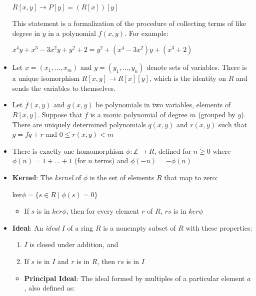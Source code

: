 \documentclass[12pt]{article}
\begin{document}
\begin{itemize}
  \begin{center}
    $R[x,y] \to P[y] = (R[x])[y]$
  \end{center}
  This statement is a formalization of the procedure of collecting terms of like degree in $y$ in a polynomial $f(x,y)$. For example:
  \begin{center}
    $x^4y + x^3 - 3x^2y + y^2 + 2 = y^2 + (x^4 - 3x^2)y + (x^3 + 2)$
  \end{center}
  \item Let $x = (x_1, ..., x_m)$ and $y = (y_1, ..., y_n)$ denote sets of variables. There is a unique isomorphism $R[x,y] \to R[x][y]$, which is the identity on $R$ and sends the variables to themselves.
  \item Let $f(x,y)$ and $g(x,y)$ be polynomials in two variables, elements of $R[x,y]$. Suppose that $f$ is a monic polynomial of degree $m$ (grouped by $y$). There are uniquely determined polynomials $q(x,y)$ and $r(x,y)$ such that $g = fq + r$ and $0 \leqslant r(x,y) < m$
  \item There is exactly one homomorphism $\phi: \mathbb{Z} \to R$, defined for $n \geqslant 0$ where $\phi(n) = 1 + ... + 1$ (for $n$ terms) and $\phi(-n) = -\phi(n)$
  \item \textbf{Kernel}: The \textit{kernel} of $\phi$ is the set of elements $R$ that map to zero:
  \begin{center}
    ker$\phi = \{s \in R \mid \phi(s) = 0\}$
  \end{center}
  \begin{itemize}
    \item If $s$ is in $ker\phi$, then for every element $r$ of $R$, $rs$ is in $ker\phi$
  \end{itemize}
  \item \textbf{Ideal}: An \textit{ideal} $I$ of a ring $R$ is a nonempty subset of $R$ with these properties:
  \begin{enumerate}
    \begin{enumerate}
      \item $I$ is closed under addition, and
      \item If $s$ is in $I$ and $r$ is in $R$, then $rs$ is in $I$
    \end{enumerate}
  \end{enumerate}
  \begin{itemize}
    \item \textbf{Principal Ideal}: The ideal formed by multiples of a particular element $a$, also defined as:
    \begin{center}

\end{center}
\end{itemize}
\end{itemize}
\end{document}
